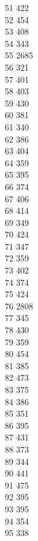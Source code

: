 { 51	422 \\
 52	454 \\
 53	408 \\
 54	343 \\
 55	2685 \\
 56	321 \\
 57	401 \\
 58	403 \\
 59	430 \\
 60	381 \\
 61	340 \\
 62	386 \\
 63	404 \\
 64	359 \\
 65	395 \\
 66	374 \\
 67	406 \\
 68	414 \\
 69	349 \\
 70	424 \\
 71	347 \\
 72	359 \\
 73	402 \\
 74	374 \\
 75	424 \\
 76	2808 \\
 77	345 \\
 78	430 \\
 79	359 \\
 80	454 \\
 81	385 \\
 82	473 \\
 83	375 \\
 84	386 \\
 85	351 \\
 86	395 \\
 87	431 \\
 88	373 \\
 89	344 \\
 90	441 \\
 91	475 \\
 92	395 \\
 93	395 \\
 94	354 \\
 95	338 \\
}
